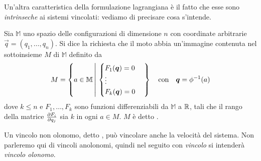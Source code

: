 Un'altra caratteristica della formulazione lagrangiana è il fatto che esse sono \emph{intrinseche} ai sistemi vincolati: vediamo di precisare cosa s'intende.

\begin{definition}
  Sia $\mathbb{M}$ uno spazio delle configurazioni di dimensione $n$ con coordinate arbitrarie $\vec{q} = (q_1, \ldots, q_n)$. Si dice  la richiesta che il moto abbia un'immagine contenuta nel sottoinsieme $M$ di $\mathbb{M}$ definito da \begin{equation}
    M = \left\{ a \in \mathbb{M} \left|\ \begin{cases} 
      F_1(\vec{q}) = 0 \\
      \vdots \\
      F_k(\vec{q}) = 0
    \end{cases} \right. \right\} \qqtext{con} \vec{q} = \phi^{-1}(a)
  \end{equation} 
  dove $k \le n$ e $F_1, \ldots, F_k$ sono funzioni differenziabili da $\mathbb{M}$ a $\mathbb{R}$, tali che il rango della matrice $\pdv{F_i}{q_j}(a)$ sia $k$ in ogni $a \in M$. $M$ è detto .
\end{definition}
\begin{remark}
  Un vincolo non olonomo, detto , può vincolare anche la velocità del sistema. Non parleremo qui di vincoli anolonomi, quindi nel seguito con \emph{vincolo} si intenderà \emph{vincolo olonomo}.
\end{remark}

